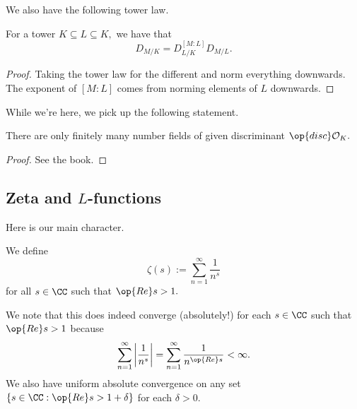 \documentclass[../notes.tex]{subfiles}
\begin{document}
We also have the following tower law.
\begin{proposition}
	For a tower $K\subseteq L\subseteq K,$ we have that
	\[D_{M/K}=D_{L/K}^{[M:L]}D_{M/L}.\]
\end{proposition}
\begin{proof}
	Taking the tower law for the different and norm everything downwards. The exponent of $[M:L]$ comes from {norm}ing elements of $L$ downwards.
\end{proof}
While we're here, we pick up the following statement.
\begin{theorem}
	There are only finitely many number fields of given discriminant $\op{disc}\mathcal O_K.$
\end{theorem}
\begin{proof}
	See the book.
\end{proof}

\subsection{Zeta and \texorpdfstring{$L$}{L}-functions}
Here is our main character.
\begin{definition}
	We define
	\[\zeta(s):=\sum_{n=1}^\infty\frac1{n^s}\]
	for all $s\in\CC$ such that $\op{Re}s>1.$
\end{definition}
We note that this does indeed converge (absolutely!) for each $s\in\CC$ such that $\op{Re}s>1$ because
\[\sum_{n=1}^\infty\left|\frac1{n^s}\right|=\sum_{n=1}^\infty\frac1{n^{\op{Re}s}}<\infty.\]
We also have uniform absolute convergence on any set $\{s\in\CC:\op{Re}s>1+\delta\}$ for each $\delta>0.$
\end{document}
